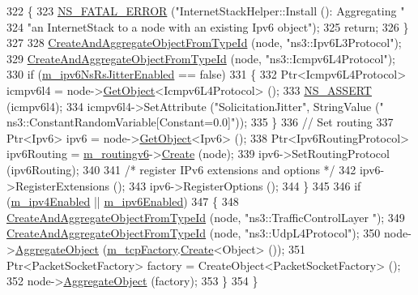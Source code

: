 \begin{DoxyCode}
322         \{
323           \hyperlink{group__fatal_ga5131d5e3f75d7d4cbfd706ac456fdc85}{NS\_FATAL\_ERROR} (\textcolor{stringliteral}{"InternetStackHelper::Install (): Aggregating "} 
324                           \textcolor{stringliteral}{"an InternetStack to a node with an existing Ipv6 object"});
325           \textcolor{keywordflow}{return};
326         \}
327 
328       \hyperlink{classns3_1_1InternetStackHelper_a6605ba9c1bbfdf9ebe09c5dbcfce2451}{CreateAndAggregateObjectFromTypeId} (node, \textcolor{stringliteral}{"ns3::Ipv6L3Protocol"});
329       \hyperlink{classns3_1_1InternetStackHelper_a6605ba9c1bbfdf9ebe09c5dbcfce2451}{CreateAndAggregateObjectFromTypeId} (node, \textcolor{stringliteral}{"ns3::Icmpv6L4Protocol"});
330       \textcolor{keywordflow}{if} (\hyperlink{classns3_1_1InternetStackHelper_a465f1786b918e4b3b3640d958d6e3212}{m\_ipv6NsRsJitterEnabled} == \textcolor{keyword}{false})
331         \{
332           Ptr<Icmpv6L4Protocol> icmpv6l4 = node->\hyperlink{classns3_1_1Object_a13e18c00017096c8381eb651d5bd0783}{GetObject}<Icmpv6L4Protocol> ();
333           \hyperlink{assert_8h_a6dccdb0de9b252f60088ce281c49d052}{NS\_ASSERT} (icmpv6l4);
334           icmpv6l4->SetAttribute (\textcolor{stringliteral}{"SolicitationJitter"}, StringValue (\textcolor{stringliteral}{"
      ns3::ConstantRandomVariable[Constant=0.0]"}));
335         \}
336       \textcolor{comment}{// Set routing}
337       Ptr<Ipv6> ipv6 = node->\hyperlink{classns3_1_1Object_a13e18c00017096c8381eb651d5bd0783}{GetObject}<Ipv6> ();
338       Ptr<Ipv6RoutingProtocol> ipv6Routing = \hyperlink{classns3_1_1InternetStackHelper_ab00253ad66b420c44ab0226d333c51dd}{m\_routingv6}->\hyperlink{classns3_1_1Ipv6RoutingHelper_aee8501a0e661843ccf9da08e3e56614b}{Create} (node);
339       ipv6->SetRoutingProtocol (ipv6Routing);
340 
341       \textcolor{comment}{/* register IPv6 extensions and options */}
342       ipv6->RegisterExtensions ();
343       ipv6->RegisterOptions ();
344     \}
345 
346   \textcolor{keywordflow}{if} (\hyperlink{classns3_1_1InternetStackHelper_a52b041bc6e084a821e6885c71d38df31}{m\_ipv4Enabled} || \hyperlink{classns3_1_1InternetStackHelper_a2eade9878232a41166cd0638cab7c3bf}{m\_ipv6Enabled})
347     \{
348       \hyperlink{classns3_1_1InternetStackHelper_a6605ba9c1bbfdf9ebe09c5dbcfce2451}{CreateAndAggregateObjectFromTypeId} (node, \textcolor{stringliteral}{"ns3::TrafficControlLayer
      "});
349       \hyperlink{classns3_1_1InternetStackHelper_a6605ba9c1bbfdf9ebe09c5dbcfce2451}{CreateAndAggregateObjectFromTypeId} (node, \textcolor{stringliteral}{"ns3::UdpL4Protocol"});
350       node->\hyperlink{classns3_1_1Object_a79dd435d300f3deca814553f561a2922}{AggregateObject} (\hyperlink{classns3_1_1InternetStackHelper_a70733544910e58abfe1b238263ea5a68}{m\_tcpFactory}.\hyperlink{classns3_1_1ObjectFactory_a18152e93f0a6fe184ed7300cb31e9896}{Create}<Object> ());
351       Ptr<PacketSocketFactory> factory = CreateObject<PacketSocketFactory> ();
352       node->\hyperlink{classns3_1_1Object_a79dd435d300f3deca814553f561a2922}{AggregateObject} (factory);
353     \}
354 \}
\end{DoxyCode}


